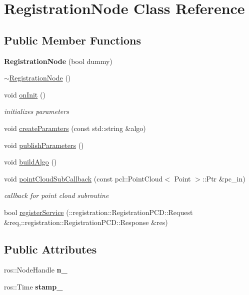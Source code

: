 \hypertarget{classRegistrationNode}{
\section{RegistrationNode Class Reference}
\label{classRegistrationNode}
}
\subsection*{Public Member Functions}
\begin{DoxyCompactItemize}
\item 
\hypertarget{classRegistrationNode_a4d2461773d8a8736556c5a14e22ead39}{
{\bfseries RegistrationNode} (bool dummy)}
\label{classRegistrationNode_a4d2461773d8a8736556c5a14e22ead39}

\item 
\hyperlink{classRegistrationNode_a061d1dd7a7d20ce2f6f1b49effc242f7}{$\sim$RegistrationNode} ()
\item 
void \hyperlink{classRegistrationNode_a088465f420639938a06747c8ee4c4df7}{onInit} ()
\begin{DoxyCompactList}\small\item\em initializes parameters \item\end{DoxyCompactList}\item 
void \hyperlink{classRegistrationNode_aa4c32460d529b455cd3a8f264e379ecb}{createParamters} (const std::string \&algo)
\item 
void \hyperlink{classRegistrationNode_a314ac88efd6a9165c5db16de31a68496}{publishParameters} ()
\item 
void \hyperlink{classRegistrationNode_a7da9e7d7af487ba6760e656b6a9790a4}{buildAlgo} ()
\item 
void \hyperlink{classRegistrationNode_ad58ddd35fc39f760197225500100ac30}{pointCloudSubCallback} (const pcl::PointCloud$<$ Point $>$::Ptr \&pc\_\-in)
\begin{DoxyCompactList}\small\item\em callback for point cloud subroutine \item\end{DoxyCompactList}\item 
bool \hyperlink{classRegistrationNode_a83816fd7a40b43b04a76c4e71995d215}{registerService} (::registration::RegistrationPCD::Request \&req,::registration::RegistrationPCD::Response \&res)
\end{DoxyCompactItemize}
\subsection*{Public Attributes}
\begin{DoxyCompactItemize}
\item 
\hypertarget{classRegistrationNode_ad756391e2bcbae371580c09249fb9277}{
ros::NodeHandle {\bfseries n\_\-}}
\label{classRegistrationNode_ad756391e2bcbae371580c09249fb9277}

\item 
\hypertarget{classRegistrationNode_a97206aeb3f84ce6ec1d92c2bafa55ca9}{
ros::Time {\bfseries stamp\_\-}}
\label{classRegistrationNode_a97206aeb3f84ce6ec1d92c2bafa55ca9}

\end{DoxyCompactItemize}
